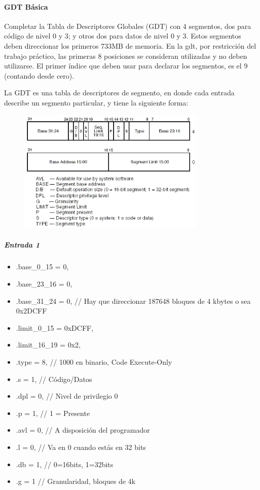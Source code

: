 \paragraph{GDT Básica}\label{subsubsec:ej1-a}
Completar la Tabla de Descriptores Globales (GDT) con 4 segmentos, dos para
código de nivel 0 y 3; y otros dos para datos de nivel 0 y 3. Estos segmentos
deben direccionar los primeros 733MB de memoria. En la gdt, por restricción del
trabajo práctico, las primeras 8 posiciones se consideran utilizadas y no
deben utilizarse. El primer índice que deben usar para declarar los segmentos,
es el 9 (contando desde cero).
\hruler

La GDT es una tabla de descriptores de segmento, en donde cada entrada describe
un segmento particular, y tiene la siguiente forma:

\begin{figure}[H]
\begin{center}
\includegraphics[width=9cm]{imagenes/gdt.png}
\end{center}
\end{figure}

\subparagraph*{Entrada 1}
\begin{itemize}
	
    \item .base_0_15 = 0,

    \item .base_23_16 = 0,
    
    \item .base_31_24 = 0,    // Hay que direccionar 187648 bloques de 4 kbytes o sea 0x2DCFF
    \item .limit_0_15 = 0xDCFF,
    \item .limit_16_19 = 0x2,
    \item .type = 8, // 1000 en binario, Code Execute-Only
    \item .s  = 1, // Código/Datos
    \item .dpl = 0, // Nivel de privilegio 0
    \item .p = 1, // 1 = Presente
    \item .avl = 0, // A disposición del programador
    \item .l = 0, // Va en 0 cuando estás en 32 bits
    \item .db = 1, // 0=16bits, 1=32bits
    \item .g = 1 // Granularidad, bloques de 4k

\end{itemize}

